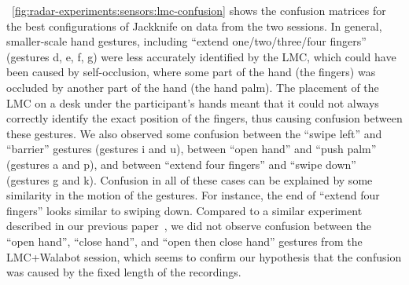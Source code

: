 \fig~\ref{fig:radar-experiments:sensors:lmc-confusion} shows the confusion matrices for the best configurations of Jackknife on data from the two sessions. 
%
In general, smaller-scale hand gestures, including ``extend one/two/three/four fingers'' (gestures d, e, f, g) were less accurately identified by the LMC, which could have been caused by self-occlusion, where some part of the hand (\eg the fingers) was occluded by another part of the hand (\eg the hand palm). The placement of the LMC on a desk under the participant's hands meant that it could not always correctly identify the exact position of the fingers, thus causing confusion between these gestures.
%
We also observed some confusion between the ``swipe left'' and ``barrier'' gestures (gestures i and u), between ``open hand'' and ``push palm'' (gestures a and p), and between ``extend four fingers'' and ``swipe down'' (gestures g and k). Confusion in all of these cases can be explained by some similarity in the motion of the gestures. For instance, the end of ``extend four fingers'' looks similar to swiping down.
%
Compared to a similar experiment described in our previous paper~\cite{Sluyters:2022:IUI}, we did not observe confusion between the ``open hand'', ``close hand'', and ``open then close hand'' gestures from the LMC+Walabot session, which seems to confirm our hypothesis that the confusion was caused by the fixed length of the recordings.



